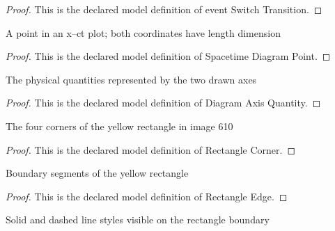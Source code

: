 \begin{proof}
  This is the declared model definition of event Switch Transition.
\end{proof}
\begin{definition}
  \label{def:physics:phyx-mini-0610:phyxminiproblems-problemphyxmini0610-spacetimediagrampoint}
  A point in an x--ct plot; both coordinates have length dimension
\end{definition}
\begin{proof}
  This is the declared model definition of Spacetime Diagram Point.
\end{proof}
\begin{definition}
  \label{def:physics:phyx-mini-0610:phyxminiproblems-problemphyxmini0610-diagramaxisquantity}
  The physical quantities represented by the two drawn axes
\end{definition}
\begin{proof}
  This is the declared model definition of Diagram Axis Quantity.
\end{proof}
\begin{definition}
  \label{def:physics:phyx-mini-0610:phyxminiproblems-problemphyxmini0610-rectanglecorner}
  The four corners of the yellow rectangle in image 610
\end{definition}
\begin{proof}
  This is the declared model definition of Rectangle Corner.
\end{proof}
\begin{definition}
  \label{def:physics:phyx-mini-0610:phyxminiproblems-problemphyxmini0610-rectangleedge}
  Boundary segments of the yellow rectangle
\end{definition}
\begin{proof}
  This is the declared model definition of Rectangle Edge.
\end{proof}
\begin{definition}
  \label{def:physics:phyx-mini-0610:phyxminiproblems-problemphyxmini0610-boundarylinestyle}
  Solid and dashed line styles visible on the rectangle boundary
\end{definition}
